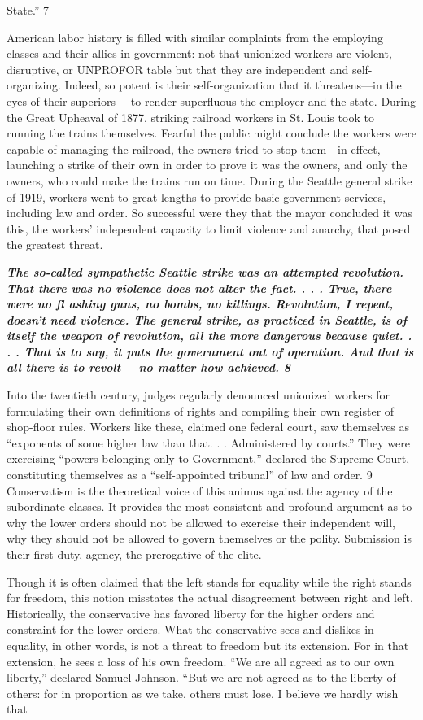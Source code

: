 State.” {\color{blue} 7 } {\par} American labor history is filled with similar complaints from the employing classes and their allies in government: not that unionized workers are violent, disruptive, or UNPROFOR table but that they are independent and self-organizing. Indeed, so potent is their self-organization that it threatens—in the eyes of their superiors— to render superfluous the employer and the state. During the Great Upheaval of 1877, striking railroad workers in St. Louis took to running the trains themselves. Fearful the public might conclude the workers were capable of managing the railroad, the owners tried to stop them—in effect, launching a strike of their own in order to prove it was the owners, and only the owners, who could make the trains run on time. During the Seattle general strike of 1919, workers went to great lengths to provide basic government services, including law and order. So successful were they that the mayor concluded it was this, the workers’ independent capacity to limit violence and anarchy, that posed the greatest threat.{\par} {\textbf{\textit{The so-called sympathetic Seattle strike was an attempted revolution. That there was no violence does not alter the fact. . . . True, there were no fl ashing guns, no bombs, no killings. Revolution, I repeat, doesn’t need violence. The general strike, as practiced in Seattle, is of itself the weapon of revolution, all the more dangerous because quiet. . . . That is to say, it puts the government out of operation. And that is all there is to revolt— no matter how achieved. {\color{blue} 8 } } } }{\par} Into the twentieth century, judges regularly denounced unionized workers for formulating their own definitions of rights and compiling their own register of shop-floor rules. Workers like these, claimed one federal court, saw themselves as “exponents of some higher law than that. . . Administered by courts.” They were exercising “powers belonging only to Government,” declared the Supreme Court, constituting themselves as a “self-appointed tribunal” of law and order. {\color{blue} 9 } Conservatism is the theoretical voice of this animus against the agency of the subordinate classes. It provides the most consistent and profound argument as to why the lower orders should not be allowed to exercise their independent will, why they should not be allowed to govern themselves or the polity. Submission is their first duty, agency, the prerogative of the elite.{\par} Though it is often claimed that the left stands for equality while the right stands for freedom, this notion misstates the actual disagreement between right and left. Historically, the conservative has favored liberty for the higher orders and constraint for the lower orders. What the conservative sees and dislikes in equality, in other words, is not a threat to freedom but its extension. For in that extension, he sees a loss of his own freedom. “We are all agreed as to our own liberty,” declared Samuel Johnson. “But we are not agreed as to the liberty of others: for in proportion as we take, others must lose. I believe we hardly wish that 